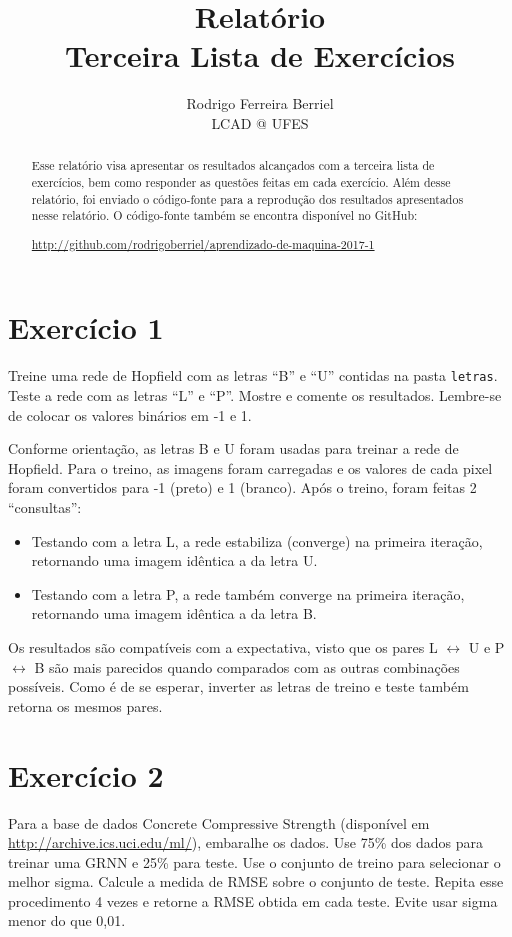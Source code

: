 \documentclass{article}
\title{Relatório\\Terceira Lista de Exercícios}
\author{
  Rodrigo Ferreira Berriel\\
  LCAD @ UFES
}
\begin{document}
\maketitle

\begin{abstract}
  Esse relatório visa apresentar os resultados alcançados com a terceira lista de exercícios, bem como responder as questões feitas em cada exercício. Além desse relatório, foi enviado o código-fonte para a reprodução dos resultados apresentados nesse relatório. O código-fonte também se encontra disponível no GitHub:
  
  \url{http://github.com/rodrigoberriel/aprendizado-de-maquina-2017-1}
\end{abstract}

\section{Exercício 1}

Treine uma rede de Hopfield com as letras ``B'' e ``U'' contidas na pasta \texttt{letras}. Teste a rede com as letras ``L'' e ``P''. Mostre e comente os resultados. Lembre-se de colocar os valores binários em -1 e 1.

Conforme orientação, as letras B e U foram usadas para treinar a rede de Hopfield. Para o treino, as imagens foram carregadas e os valores de cada pixel foram convertidos para -1 (preto) e 1 (branco). Após o treino, foram feitas 2 ``consultas'':

\begin{itemize}
	\item Testando com a letra L, a rede estabiliza (converge) na primeira iteração, retornando uma imagem idêntica a da letra U.
	\item Testando com a letra P, a rede também converge na primeira iteração, retornando uma imagem idêntica a da letra B.
\end{itemize}

Os resultados são compatíveis com a expectativa, visto que os pares L $\leftrightarrow$ U e P $\leftrightarrow$ B são mais parecidos quando comparados com as outras combinações possíveis. Como é de se esperar, inverter as letras de treino e teste também retorna os mesmos pares.

\section{Exercício 2}

Para a base de dados Concrete Compressive Strength (disponível em \url{http://archive.ics.uci.edu/ml/}), embaralhe os dados. Use 75\% dos dados para treinar uma GRNN e 25\% para teste. Use o conjunto de treino para selecionar o melhor sigma. Calcule a medida de RMSE sobre o conjunto de teste. Repita esse procedimento 4 vezes e retorne a RMSE obtida em cada teste. Evite usar sigma menor do que 0,01.
\end{document}
